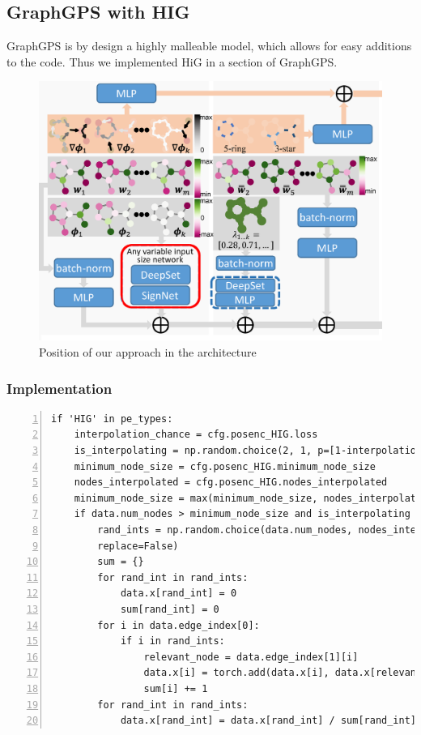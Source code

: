 \subsection{GraphGPS with HIG}
GraphGPS is by design a highly malleable model, which allows for easy additions to the code. Thus we implemented HiG in a section of GraphGPS.

\begin{figure}[ht]
    \centering
    \includegraphics[scale=0.2]{tex/res/gps_hig_position.png}
    \caption{Position of our approach in the architecture}
    \label{fig:gps-hig-position}
\end{figure}

\subsubsection{Implementation}

\begin{lstlisting}[style=cpp,caption={HiG-Code in GraphGPS},label={lst:Void},numbers=left]
if 'HIG' in pe_types:
    interpolation_chance = cfg.posenc_HIG.loss
    is_interpolating = np.random.choice(2, 1, p=[1-interpolation_chance,interpolation_chance])[0]
    minimum_node_size = cfg.posenc_HIG.minimum_node_size
    nodes_interpolated = cfg.posenc_HIG.nodes_interpolated
    minimum_node_size = max(minimum_node_size, nodes_interpolated)
    if data.num_nodes > minimum_node_size and is_interpolating == 1:
        rand_ints = np.random.choice(data.num_nodes, nodes_interpolated, 
	    replace=False)
        sum = {}
        for rand_int in rand_ints:
            data.x[rand_int] = 0
            sum[rand_int] = 0
        for i in data.edge_index[0]:
            if i in rand_ints:
                relevant_node = data.edge_index[1][i]
                data.x[i] = torch.add(data.x[i], data.x[relevant_node])
                sum[i] += 1
        for rand_int in rand_ints:
            data.x[rand_int] = data.x[rand_int] / sum[rand_int]
\end{lstlisting}

